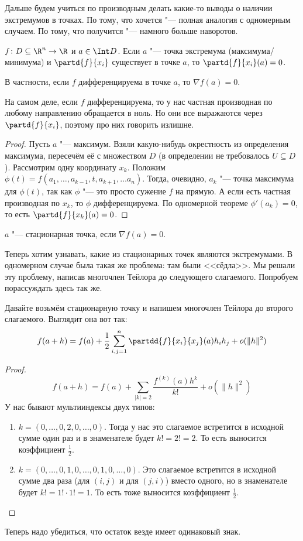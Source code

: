 Дальше будем учиться по производным делать какие-то выводы о наличии экстремумов в точках.
По тому, что хочется "--- полная аналогия с одномерным случаем.
По тому, что получится "--- намного больше наворотов.

\begin{theorem}
	$f \colon D \subseteq \R^n \to \R$ и $a \in \Int D$.
	Если $a$ "--- точка экстремума (максимума/минимума) и $\partd{f}{x_i}$ существует в точке $a$,
	то $\partd{f}{x_i}(a)=0$.
\end{theorem}
\begin{Rem}
	В частности, если $f$ дифференцируема в точке $a$, то $\nabla f(a) = 0$.
\end{Rem}
\begin{Rem}
	На самом деле, если $f$ дифференцируема, то у нас частная производная по
	любому направлению обращается в ноль.
	Но они все выражаются через $\partd{f}{x_i}$, поэтому про них говорить излишне.
\end{Rem}
\begin{proof}
	Пусть $a$ "--- максимум.
	Взяли какую-нибудь окрестность из определения максимума, пересечём её с множеством $D$
	(в определении не требовалось $U \subseteq D$).
	Рассмотрим одну координату $x_k$.
	Положим $\phi(t)=f(a_1, \dots, a_{k-1}, t, a_{k+1}, \dots a_n)$.
	Тогда, очевидно, $a_k$ "--- точка максимума для $\phi(t)$,
	так как $\phi$ "--- это просто сужение $f$ на прямую.
	А если есть частная производная по $x_k$, то $\phi$ дифференцируема.
	По одномерной теореме $\phi'(a_k)=0$, то есть $\partd{f}{x_k}(a)=0$.
\end{proof}

\begin{Def}
	$a$ "--- стационарная точка, если $\nabla f(a) = 0$.
\end{Def}

Теперь хотим узнавать, какие из стационарных точек являются экстремумами.
В одномерном случае была такая же проблема: там были <<сёдла>>.
Мы решали эту проблему, написав многочлен Тейлора до следующего слагаемого.
Попробуем порассуждать здесь так же.

Давайте возьмём стационарную точку и напишем многочлен Тейлора до второго слагаемого.
Выглядит она вот так:
\[
	f(a+h) = f(a) + \frac12 \sum_{i,j=1}^n \partdd{f}{x_i}{x_j} (a) h_i h_j + o(\|h\|^2)
\]
\begin{proof}
	\[ f(a+h) = f(a) + \sum_{|k|=2} \frac{f^{(k)}(a)h^k}{k!} + o(\|h\|^2)\]
	У нас бывают мультииндексы двух типов:
	\begin{enumerate}
	\item
		$k=(0, \dots, 0, 2, 0, \dots, 0)$.
		Тогда у нас это слагаемое встретится в исходной сумме один раз и в знаменателе будет $k!=2!=2$.
		То есть выносится коэффициент $\frac12$.
	\item
		$k=(0, \dots, 0, 1, 0, \dots, 0, 1, 0, \dots, 0)$.
		Это слагаемое встретится в исходной сумме два раза (для $(i, j)$ и для $(j, i)$)
		вместо одного, но в знаменателе будет $k!=1!\cdot1!=1$.
		То есть тоже выносится коэффициент $\frac12$.
	\end{enumerate}
\end{proof}
Теперь надо убедиться, что остаток везде имеет одинаковый знак.


